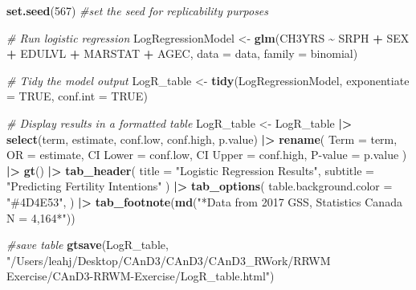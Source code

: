 \documentclass[
]{article}
\newenvironment{Shaded}{\begin{snugshade}}{\end{snugshade}}
\newcommand{\AttributeTok}[1]{\textcolor[rgb]{0.13,0.29,0.53}{#1}}
\newcommand{\CommentTok}[1]{\textcolor[rgb]{0.56,0.35,0.01}{\textit{#1}}}
\newcommand{\ConstantTok}[1]{\textcolor[rgb]{0.56,0.35,0.01}{#1}}
\newcommand{\DecValTok}[1]{\textcolor[rgb]{0.00,0.00,0.81}{#1}}
\newcommand{\FunctionTok}[1]{\textcolor[rgb]{0.13,0.29,0.53}{\textbf{#1}}}
\newcommand{\NormalTok}[1]{#1}
\newcommand{\OtherTok}[1]{\textcolor[rgb]{0.56,0.35,0.01}{#1}}
\newcommand{\SpecialCharTok}[1]{\textcolor[rgb]{0.81,0.36,0.00}{\textbf{#1}}}
\newcommand{\StringTok}[1]{\textcolor[rgb]{0.31,0.60,0.02}{#1}}
\begin{document}
\begin{Shaded}
\begin{Highlighting}[]
\FunctionTok{set.seed}\NormalTok{(}\DecValTok{567}\NormalTok{) }\CommentTok{\#set the seed for replicability purposes}


\CommentTok{\# Run logistic regression}
\NormalTok{LogRegressionModel }\OtherTok{\textless{}{-}} \FunctionTok{glm}\NormalTok{(CH3YRS }\SpecialCharTok{\textasciitilde{}}\NormalTok{ SRPH }\SpecialCharTok{+}\NormalTok{ SEX }\SpecialCharTok{+}\NormalTok{ EDULVL }\SpecialCharTok{+}\NormalTok{ MARSTAT }\SpecialCharTok{+}\NormalTok{ AGEC,}
             \AttributeTok{data =}\NormalTok{ data,}
             \AttributeTok{family =}\NormalTok{ binomial)}

\CommentTok{\# Tidy the model output}
\NormalTok{LogR\_table }\OtherTok{\textless{}{-}} \FunctionTok{tidy}\NormalTok{(LogRegressionModel, }\AttributeTok{exponentiate =} \ConstantTok{TRUE}\NormalTok{, }\AttributeTok{conf.int =} \ConstantTok{TRUE}\NormalTok{)}

\CommentTok{\# Display results in a formatted table}
\NormalTok{LogR\_table }\OtherTok{\textless{}{-}}\NormalTok{ LogR\_table }\SpecialCharTok{|\textgreater{}}
  \FunctionTok{select}\NormalTok{(term, estimate, conf.low, conf.high, p.value) }\SpecialCharTok{|\textgreater{}}
  \FunctionTok{rename}\NormalTok{(}
    \AttributeTok{Term =}\NormalTok{ term,}
    \AttributeTok{OR =}\NormalTok{ estimate,}
    \StringTok{\textasciigrave{}}\AttributeTok{CI Lower}\StringTok{\textasciigrave{}} \OtherTok{=}\NormalTok{ conf.low,}
    \StringTok{\textasciigrave{}}\AttributeTok{CI Upper}\StringTok{\textasciigrave{}} \OtherTok{=}\NormalTok{ conf.high,}
    \StringTok{\textasciigrave{}}\AttributeTok{P{-}value}\StringTok{\textasciigrave{}} \OtherTok{=}\NormalTok{ p.value}
\NormalTok{  ) }\SpecialCharTok{|\textgreater{}}
  \FunctionTok{gt}\NormalTok{() }\SpecialCharTok{|\textgreater{}}
  \FunctionTok{tab\_header}\NormalTok{(}
    \AttributeTok{title =} \StringTok{"Logistic Regression Results"}\NormalTok{,}
    \AttributeTok{subtitle =} \StringTok{"Predicting Fertility Intentions"}
\NormalTok{  ) }\SpecialCharTok{|\textgreater{}} 
  \FunctionTok{tab\_options}\NormalTok{(}
    \AttributeTok{table.background.color =} \StringTok{"\#4D4E53"}\NormalTok{,}
\NormalTok{  ) }\SpecialCharTok{|\textgreater{}} 
  \FunctionTok{tab\_footnote}\NormalTok{(}\FunctionTok{md}\NormalTok{(}\StringTok{"*Data from 2017 GSS, Statistics Canada}
\StringTok{                  N = 4,164*"}\NormalTok{))}

\CommentTok{\#save table}
\FunctionTok{gtsave}\NormalTok{(LogR\_table, }\StringTok{"/Users/leahj/Desktop/CAnD3/CAnD3/CAnD3\_RWork/RRWM Exercise/CAnD3{-}RRWM{-}Exercise/LogR\_table.html"}\NormalTok{)}
\end{Highlighting}
\end{Shaded}
\end{document}
